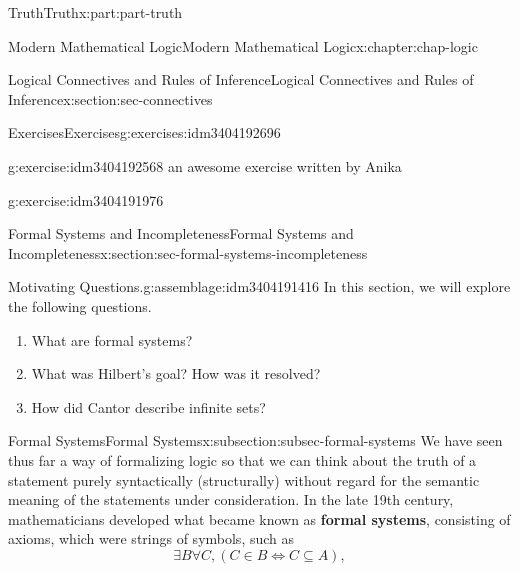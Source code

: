 \documentclass[oneside,10pt,]{book}
\newcommand{\terminology}[1]{\textbf{#1}}
\numberwithin{equation}{section}
\begin{document}
\begin{partptx}{Truth}{}{Truth}{}{}{x:part:part-truth}
\begin{chapterptx}{Modern Mathematical Logic}{}{Modern Mathematical Logic}{}{}{x:chapter:chap-logic}
\begin{sectionptx}{Logical Connectives and Rules of Inference}{}{Logical Connectives and Rules of Inference}{}{}{x:section:sec-connectives}
\begin{itemize}[label=\textbullet]
\end{itemize}
%
%
\typeout{************************************************}
\typeout{************************************************}
%
\begin{exercises-subsection-numberless}{Exercises}{}{Exercises}{}{}{g:exercises:idm3404192696}
\begin{divisionexercise}{1}{}{}{g:exercise:idm3404192568}%
an awesome exercise written by Anika%
\end{divisionexercise}%
\begin{divisionexercise}{2}{}{}{g:exercise:idm3404191976}%
\end{divisionexercise}%
\end{exercises-subsection-numberless}
\end{sectionptx}
%
%
\typeout{************************************************}
\typeout{************************************************}
%
\begin{sectionptx}{Formal Systems and Incompleteness}{}{Formal Systems and Incompleteness}{}{}{x:section:sec-formal-systems-incompleteness}
\begin{assemblage}{Motivating Questions.}{g:assemblage:idm3404191416}%
In this section, we will explore the following questions. %
\begin{enumerate}
\item{}What are formal systems?%
\item{}What was Hilbert's goal? How was it resolved?%
\item{}How did Cantor describe infinite sets?%
\end{enumerate}
%
\end{assemblage}
%
%
\typeout{************************************************}
\typeout{************************************************}
%
\begin{subsectionptx}{Formal Systems}{}{Formal Systems}{}{}{x:subsection:subsec-formal-systems}
We have seen thus far a way of formalizing logic so that we can think about the truth of a statement purely syntactically (structurally) without regard for the semantic meaning of the statements under consideration. In the late 19th century, mathematicians developed what became known as \terminology{formal systems}, consisting of axioms, which were strings of symbols, such as%
\begin{equation*}
\exists B \forall C, (C\in B \Leftrightarrow C\subseteq A),

\end{equation*}
\end{subsectionptx}
\end{sectionptx}
\end{chapterptx}
\end{partptx}
\end{document}
